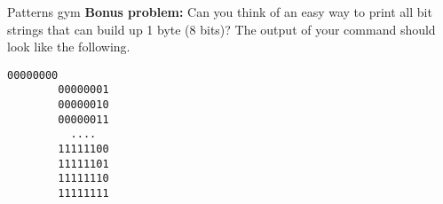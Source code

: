\begin{exercise}[Inspirational]{Patterns gym}
    \vspace{5mm}
    \textbf{Bonus problem:} Can you think of an easy way to print all bit strings that can build up 1 byte (8 bits)?
    The output of your command should look like the following.
    \begin{lstlisting}[style=MyBash]
        00000000
        00000001
        00000010
        00000011
          ....
        11111100
        11111101
        11111110
        11111111
    \end{lstlisting}
    \vspace{5mm}
\end{exercise}